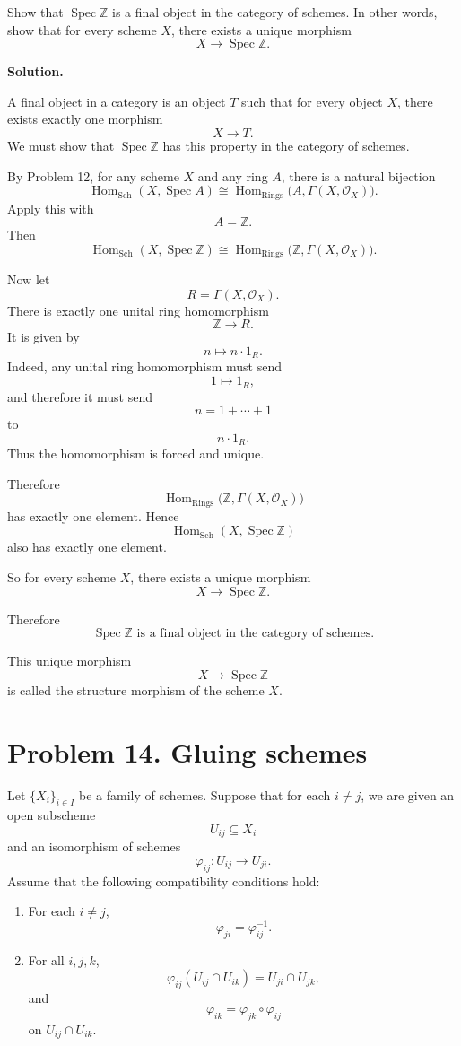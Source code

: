 \documentclass[12pt,a4paper]{article}
\DeclareMathOperator{\Hom}{Hom}
\newcommand{\Spec}{\operatorname{Spec}}
\newcommand{\Sch}{\mathrm{Sch}}
\newcommand{\Rings}{\mathrm{Rings}}
\theoremstyle{notespace}
\begin{document}
Show that \(\Spec \mathbb Z\) is a final object in the category of schemes. In other words, show that for every scheme \(X\), there exists a unique morphism
\[
X\to \Spec \mathbb Z.
\]

\textbf{Solution.}

A final object in a category is an object \(T\) such that for every object \(X\), there exists exactly one morphism
\[
X\to T.
\]
We must show that \(\Spec \mathbb Z\) has this property in the category of schemes.

By Problem 12, for any scheme \(X\) and any ring \(A\), there is a natural bijection
\[
\Hom_{\Sch}(X,\Spec A)
\cong
\Hom_{\Rings}\bigl(A,\Gamma(X,\mathcal O_X)\bigr).
\]
Apply this with
\[
A=\mathbb Z.
\]
Then
\[
\Hom_{\Sch}(X,\Spec \mathbb Z)
\cong
\Hom_{\Rings}\bigl(\mathbb Z,\Gamma(X,\mathcal O_X)\bigr).
\]

Now let
\[
R=\Gamma(X,\mathcal O_X).
\]
There is exactly one unital ring homomorphism
\[
\mathbb Z\to R.
\]
It is given by
\[
n\longmapsto n\cdot 1_R.
\]
Indeed, any unital ring homomorphism must send
\[
1\longmapsto 1_R,
\]
and therefore it must send
\[
n=1+\cdots+1
\]
to
\[
n\cdot 1_R.
\]
Thus the homomorphism is forced and unique.

Therefore
\[
\Hom_{\Rings}\bigl(\mathbb Z,\Gamma(X,\mathcal O_X)\bigr)
\]
has exactly one element. Hence
\[
\Hom_{\Sch}(X,\Spec \mathbb Z)
\]
also has exactly one element.

So for every scheme \(X\), there exists a unique morphism
\[
X\to \Spec \mathbb Z.
\]

Therefore
\[
\boxed{
	\Spec \mathbb Z \text{ is a final object in the category of schemes.}
}
\]

This unique morphism
\[
X\to \Spec \mathbb Z
\]
is called the structure morphism of the scheme \(X\).

\section{Problem 14. Gluing schemes}

Let \(\{X_i\}_{i\in I}\) be a family of schemes. Suppose that for each \(i\neq j\), we are given an open subscheme
\[
U_{ij}\subseteq X_i
\]
and an isomorphism of schemes
\[
\varphi_{ij}:U_{ij}\to U_{ji}.
\]
Assume that the following compatibility conditions hold:

\begin{enumerate}[label=\textup{(\arabic*)}]
	\item For each \(i\neq j\),
	\[
	\varphi_{ji}=\varphi_{ij}^{-1}.
	\]
	
	\item For all \(i,j,k\),
	\[
	\varphi_{ij}(U_{ij}\cap U_{ik})
	=
	U_{ji}\cap U_{jk},
	\]
	and
	\[
	\varphi_{ik}
	=
	\varphi_{jk}\circ \varphi_{ij}
	\]
	on \(U_{ij}\cap U_{ik}\).
\end{enumerate}
\end{document}
